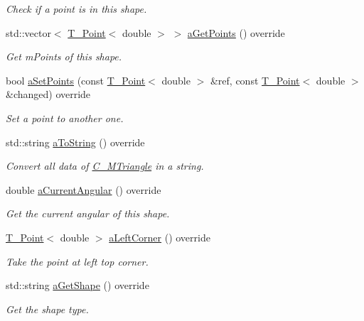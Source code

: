 \begin{DoxyCompactItemize}
\begin{DoxyCompactList}\small\item\em Check if a point is in this shape. \end{DoxyCompactList}\item 
std\+::vector$<$ \hyperlink{classT__Point}{T\+\_\+\+Point}$<$ double $>$ $>$ \hyperlink{classC__MTriangle_a3bf9bf8a23a318376e505f76089037b4}{a\+Get\+Points} () override
\begin{DoxyCompactList}\small\item\em Get m\+Points of this shape. \end{DoxyCompactList}\item 
bool \hyperlink{classC__MTriangle_a5a3971eb0aafc16e5a34bd94130d7c6b}{a\+Set\+Points} (const \hyperlink{classT__Point}{T\+\_\+\+Point}$<$ double $>$ \&ref, const \hyperlink{classT__Point}{T\+\_\+\+Point}$<$ double $>$ \&changed) override
\begin{DoxyCompactList}\small\item\em Set a point to another one. \end{DoxyCompactList}\item 
std\+::string \hyperlink{classC__MTriangle_a3a769eb21278ec456292d88385b332a2}{a\+To\+String} () override
\begin{DoxyCompactList}\small\item\em Convert all data of \hyperlink{classC__MTriangle}{C\+\_\+\+M\+Triangle} in a string. \end{DoxyCompactList}\item 
double \hyperlink{classC__MTriangle_aad1e42f1ec9c486736a403128ba47179}{a\+Current\+Angular} () override
\begin{DoxyCompactList}\small\item\em Get the current angular of this shape. \end{DoxyCompactList}\item 
\hyperlink{classT__Point}{T\+\_\+\+Point}$<$ double $>$ \hyperlink{classC__MTriangle_acebfe2f7c6792b2bfe323c4ad82970be}{a\+Left\+Corner} () override
\begin{DoxyCompactList}\small\item\em Take the point at left top corner. \end{DoxyCompactList}\item 
std\+::string \hyperlink{classC__MTriangle_aca7e38c6bf9695aacf54aa03ecfba978}{a\+Get\+Shape} () override
\begin{DoxyCompactList}\small\item\em Get the shape type. \end{DoxyCompactList}\item 

\end{DoxyCompactItemize}

